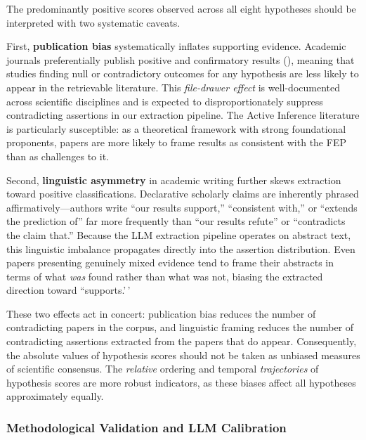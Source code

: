 \documentclass[
  english,
]{article}
\begin{document}
The predominantly positive scores observed across all eight hypotheses
should be interpreted with two systematic caveats.

First, \textbf{publication bias} systematically inflates supporting
evidence. Academic journals preferentially publish positive and
confirmatory results (\citealt{sterling1959publication}), meaning that
studies finding null or contradictory outcomes for any hypothesis are
less likely to appear in the retrievable literature. This
\textit{file-drawer effect} is well-documented across scientific
disciplines and is expected to disproportionately suppress contradicting
assertions in our extraction pipeline. The Active Inference literature
is particularly susceptible: as a theoretical framework with strong
foundational proponents, papers are more likely to frame results as
consistent with the FEP than as challenges to it.

Second, \textbf{linguistic asymmetry} in academic writing further skews
extraction toward positive classifications. Declarative scholarly claims
are inherently phrased affirmatively---authors write ``our results
support,'' ``consistent with,'' or ``extends the prediction of'' far
more frequently than ``our results refute'' or ``contradicts the claim
that.'' Because the LLM extraction pipeline operates on abstract text,
this linguistic imbalance propagates directly into the assertion
distribution. Even papers presenting genuinely mixed evidence tend to
frame their abstracts in terms of what \textit{was} found rather than
what was not, biasing the extracted direction toward ``supports.'\,'

These two effects act in concert: publication bias reduces the number of
contradicting papers in the corpus, and linguistic framing reduces the
number of contradicting assertions extracted from the papers that do
appear. Consequently, the absolute values of hypothesis scores should
not be taken as unbiased measures of scientific consensus. The
\textit{relative} ordering and temporal \textit{trajectories} of
hypothesis scores are more robust indicators, as these biases affect all
hypotheses approximately equally.

\subsubsection{Methodological Validation and LLM
Calibration}\label{methodological-validation-and-llm-calibration}
\end{document}
